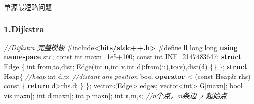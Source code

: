 \documentclass[
]{article}
\newenvironment{Shaded}{}{}
\newcommand{\AttributeTok}[1]{\textcolor[rgb]{0.49,0.56,0.16}{#1}}
\newcommand{\CommentTok}[1]{\textcolor[rgb]{0.38,0.63,0.69}{\textit{#1}}}
\newcommand{\ControlFlowTok}[1]{\textcolor[rgb]{0.00,0.44,0.13}{\textbf{#1}}}
\newcommand{\DataTypeTok}[1]{\textcolor[rgb]{0.56,0.13,0.00}{#1}}
\newcommand{\DecValTok}[1]{\textcolor[rgb]{0.25,0.63,0.44}{#1}}
\newcommand{\FloatTok}[1]{\textcolor[rgb]{0.25,0.63,0.44}{#1}}
\newcommand{\ImportTok}[1]{\textcolor[rgb]{0.00,0.50,0.00}{\textbf{#1}}}
\newcommand{\KeywordTok}[1]{\textcolor[rgb]{0.00,0.44,0.13}{\textbf{#1}}}
\newcommand{\NormalTok}[1]{#1}
\newcommand{\OperatorTok}[1]{\textcolor[rgb]{0.40,0.40,0.40}{#1}}
\newcommand{\PreprocessorTok}[1]{\textcolor[rgb]{0.74,0.48,0.00}{#1}}
\begin{document}
单源最短路问题

\hypertarget{1dijkstra}{%
\subsubsection{1.Dijkstra}\label{1dijkstra}}

\begin{Shaded}
\begin{Highlighting}[]
\CommentTok{//Dijkstra 完整模板}
\PreprocessorTok{\#include}\ImportTok{\textless{}bits/stdc++.h\textgreater{}}
\PreprocessorTok{\#define ll }\DataTypeTok{long}\PreprocessorTok{ }\DataTypeTok{long}\PreprocessorTok{ }
\KeywordTok{using} \KeywordTok{namespace}\NormalTok{ std}\OperatorTok{;}
\AttributeTok{const} \DataTypeTok{int}\NormalTok{ maxn}\OperatorTok{=}\FloatTok{1e5}\OperatorTok{+}\DecValTok{100}\OperatorTok{;}
\AttributeTok{const} \DataTypeTok{int}\NormalTok{ INF}\OperatorTok{=}\DecValTok{2147483647}\OperatorTok{;} 
\KeywordTok{struct}\NormalTok{ Edge }\OperatorTok{\{}
	\DataTypeTok{int}\NormalTok{ from}\OperatorTok{,}\NormalTok{to}\OperatorTok{,}\NormalTok{dist}\OperatorTok{;}
\NormalTok{	Edge}\OperatorTok{(}\DataTypeTok{int}\NormalTok{ u}\OperatorTok{,}\DataTypeTok{int}\NormalTok{ v}\OperatorTok{,}\DataTypeTok{int}\NormalTok{ d}\OperatorTok{):}\NormalTok{from}\OperatorTok{(}\NormalTok{u}\OperatorTok{),}\NormalTok{to}\OperatorTok{(}\NormalTok{v}\OperatorTok{),}\NormalTok{dist}\OperatorTok{(}\NormalTok{d}\OperatorTok{)} \OperatorTok{\{\}}
\OperatorTok{\};}
\KeywordTok{struct}\NormalTok{ Heap}\OperatorTok{\{}	\CommentTok{//heap}
	\DataTypeTok{int}\NormalTok{ d}\OperatorTok{,}\NormalTok{p}\OperatorTok{;} \CommentTok{//distant ans position}
	\DataTypeTok{bool} \KeywordTok{operator} \OperatorTok{\textless{}} \OperatorTok{(}\AttributeTok{const}\NormalTok{ Heap}\OperatorTok{\&}\NormalTok{ rhs}\OperatorTok{)} \AttributeTok{const} \OperatorTok{\{}
		\ControlFlowTok{return}\NormalTok{ d}\OperatorTok{\textgreater{}}\NormalTok{rhs}\OperatorTok{.}\NormalTok{d}\OperatorTok{;}
	\OperatorTok{\}}
\OperatorTok{\};}
\NormalTok{vector}\OperatorTok{\textless{}}\NormalTok{Edge}\OperatorTok{\textgreater{}}\NormalTok{ edges}\OperatorTok{;}
\NormalTok{vector}\OperatorTok{\textless{}}\DataTypeTok{int}\OperatorTok{\textgreater{}}\NormalTok{ G}\OperatorTok{[}\NormalTok{maxn}\OperatorTok{];}
\DataTypeTok{bool}\NormalTok{ vis}\OperatorTok{[}\NormalTok{maxn}\OperatorTok{];}
\DataTypeTok{int}\NormalTok{ d}\OperatorTok{[}\NormalTok{maxn}\OperatorTok{];}
\DataTypeTok{int}\NormalTok{ p}\OperatorTok{[}\NormalTok{maxn}\OperatorTok{];}
\DataTypeTok{int}\NormalTok{ n}\OperatorTok{,}\NormalTok{m}\OperatorTok{,}\NormalTok{s}\OperatorTok{;} \CommentTok{//n个点，m条边 ,s 起始点 }

\end{Highlighting}
\end{Shaded}
\end{document}
